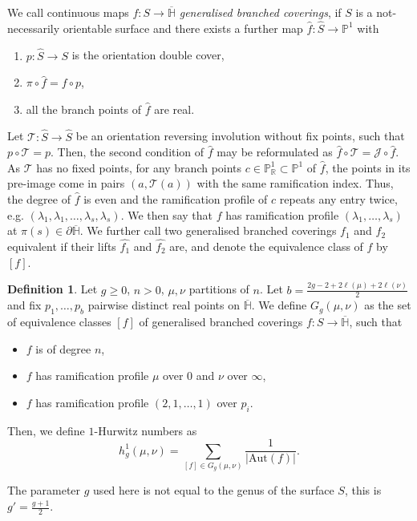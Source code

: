 \documentclass[11pt]{article}
\theoremstyle{definition}
\newtheorem{defi}[theo]{Definition}
\numberwithin{equation}{section}
\begin{document}
We call continuous maps $f\colon S\to\overline{\mathbb{H}}$ \textit{generalised branched coverings}, if $S$ is a not-necessarily orientable surface and there exists a further map $\hat{f}\colon \hat{S}\to\mathbb{P}^1$ with
    \begin{enumerate}
        \item $p\colon\hat{S}\to S$ is the orientation double cover,
        \item $\pi\circ\hat{f}=f\circ p$,
        \item all the branch points of $\hat{f}$ are real.
    \end{enumerate}
Let $\mathcal{T}\colon \hat{S}\to\hat{S}$ be an orientation reversing involution without fix points, such that $p\circ \mathcal{T}=p$. Then, the second condition of $\hat{f}$ may be reformulated as $\hat{f}\circ\mathcal{T}=\mathcal{J}\circ \hat{f}$. As $\mathcal{T}$ has no fixed points, for any branch points $c\in\mathbb{P}^1_{\mathbb{R}}\subset\mathbb{P}^1$ of $\hat{f}$, the points in its pre-image come in pairs $(a,\mathcal{T}(a))$ with the same ramification index. Thus, the degree of $\hat{f}$ is even and the ramification profile of $c$ repeats any entry twice, e.g. $(\lambda_1,\lambda_1,\dots,\lambda_s,\lambda_s)$. We then say that $f$ has ramification profile $(\lambda_1,\dots,\lambda_s)$ at $\pi(s)\in\partial\overline{\mathbb{H}}$. We further call two generalised branched coverings $f_1$ and $f_2$ equivalent if their lifts $\hat{f_1}$ and $\hat{f_2}$ are, and denote the equivalence class of $f$ by $[f]$. 

\begin{defi}\label{def-nonoriented}
    Let $g\ge0$, $n>0$, $\mu,\nu$ partitions of $n$. Let $b=\frac{2g-2+2\ell(\mu)+2\ell(\nu)}{2}$ and fix $p_1,\dots,p_b$ pairwise distinct real points on $\overline{\mathbb{H}}$. We define $G_g(\mu,\nu)$ as the set of equivalence classes $[f]$ of generalised branched coverings $f\colon S\to\overline{\mathbb{H}}$, such that
    \begin{itemize}
        \item $f$ is of degree $n$,
        \item $f$ has ramification profile $\mu$ over $0$ and $\nu$ over $\infty$,
        \item $f$ has ramification profile $(2,1,\dots,1)$ over $p_i$.
    \end{itemize}
    Then, we define $1$-Hurwitz numbers as
    \begin{equation*}
        h^1_g(\mu,\nu)=\sum_{[f]\in G_g(\mu,\nu)}\frac{1}{|\mathrm{Aut}(f)|}.
    \end{equation*}
\end{defi}
The parameter $g$ used here is not equal to the genus of the surface $S$, this is $g'=\frac{g+1}{2}.$
\end{document}
